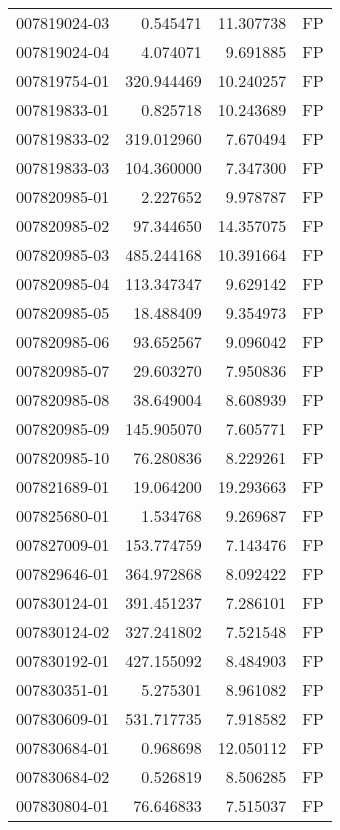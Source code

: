 \begin{tabular}{lrrl}
007819024-03 &    0.545471 &      11.307738 &   FP \\
007819024-04 &    4.074071 &       9.691885 &   FP \\
007819754-01 &  320.944469 &      10.240257 &   FP \\
007819833-01 &    0.825718 &      10.243689 &   FP \\
007819833-02 &  319.012960 &       7.670494 &   FP \\
007819833-03 &  104.360000 &       7.347300 &   FP \\
007820985-01 &    2.227652 &       9.978787 &   FP \\
007820985-02 &   97.344650 &      14.357075 &   FP \\
007820985-03 &  485.244168 &      10.391664 &   FP \\
007820985-04 &  113.347347 &       9.629142 &   FP \\
007820985-05 &   18.488409 &       9.354973 &   FP \\
007820985-06 &   93.652567 &       9.096042 &   FP \\
007820985-07 &   29.603270 &       7.950836 &   FP \\
007820985-08 &   38.649004 &       8.608939 &   FP \\
007820985-09 &  145.905070 &       7.605771 &   FP \\
007820985-10 &   76.280836 &       8.229261 &   FP \\
007821689-01 &   19.064200 &      19.293663 &   FP \\
007825680-01 &    1.534768 &       9.269687 &   FP \\
007827009-01 &  153.774759 &       7.143476 &   FP \\
007829646-01 &  364.972868 &       8.092422 &   FP \\
007830124-01 &  391.451237 &       7.286101 &   FP \\
007830124-02 &  327.241802 &       7.521548 &   FP \\
007830192-01 &  427.155092 &       8.484903 &   FP \\
007830351-01 &    5.275301 &       8.961082 &   FP \\
007830609-01 &  531.717735 &       7.918582 &   FP \\
007830684-01 &    0.968698 &      12.050112 &   FP \\
007830684-02 &    0.526819 &       8.506285 &   FP \\
007830804-01 &   76.646833 &       7.515037 &   FP \\

\end{tabular}
